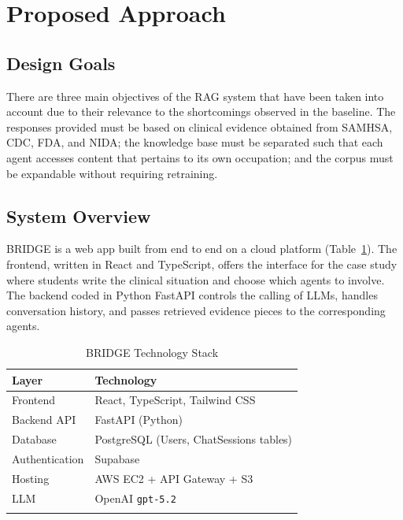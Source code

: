 \documentclass[pdflatex,sn-mathphys-num]{sn-jnl}
\theoremstyle{thmstyleone}
\theoremstyle{thmstyletwo}
\theoremstyle{thmstylethree}
\begin{document}
\section{Proposed Approach}\label{sec:proposed}

\subsection{Design Goals}

There are three main objectives of the RAG system that have been taken into account due to their relevance to the shortcomings observed in the baseline. The responses provided must be based on clinical evidence obtained from SAMHSA, CDC, FDA, and NIDA; the knowledge base must be separated such that each agent accesses content that pertains to its own occupation; and the corpus must be expandable without requiring retraining.

\subsection{System Overview}

BRIDGE is a web app built from end to end on a cloud platform (Table~\ref{tab:stack}). The frontend, written in React and TypeScript, offers the interface for the case study where students write the clinical situation and choose which agents to involve. The backend coded in Python FastAPI controls the calling of LLMs, handles conversation history, and passes retrieved evidence pieces to the corresponding agents.

\begin{table}[h]
    \centering
    \caption{BRIDGE Technology Stack}
    \label{tab:stack}
    \begin{tabular}{@{}ll@{}}
        \toprule
        \textbf{Layer} & \textbf{Technology} \\
        \midrule
        Frontend        & React, TypeScript, Tailwind CSS \\
        Backend API     & FastAPI (Python) \\
        Database        & PostgreSQL (Users, ChatSessions tables) \\
        Authentication  & Supabase \\
        Hosting         & AWS EC2 + API Gateway + S3 \\
        LLM             & OpenAI \texttt{gpt-5.2} \\
        \botrule
    \end{tabular}
\end{table}
\end{document}
